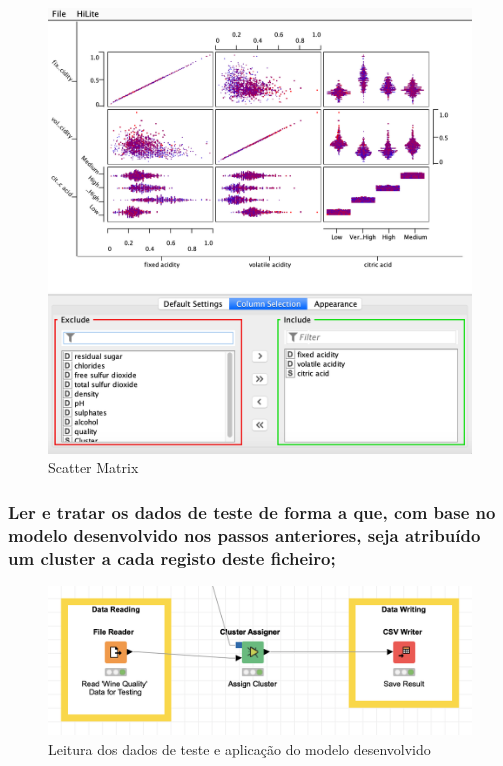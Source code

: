 \documentclass{article}
\begin{document}
\begin{figure}[H]
    \centering
    \includegraphics[scale=0.4]{Images/T4_c2.png}
    \caption{Scatter Matrix}
\end{figure}

\subsubsection{Ler e tratar os dados de teste de forma a que, com base no modelo desenvolvido nos passos anteriores, seja atribuído um cluster a cada registo deste ficheiro;}

\begin{figure}[H]
    \centering
    \includegraphics[scale=0.4]{Images/T4_d.png}
    \caption{Leitura dos dados de teste e aplicação do modelo desenvolvido}
\end{figure}
\end{document}
